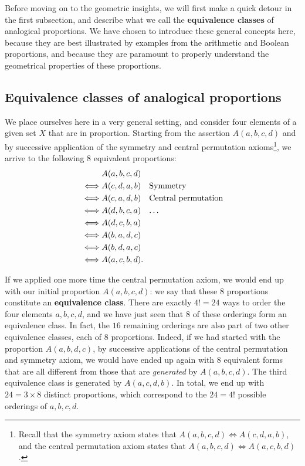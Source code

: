 Before moving on to the geometric insights, we will first make a quick
detour in the first subsection, and describe what we call the
\textbf{equivalence classes} of analogical proportions. We have chosen to
introduce these general concepts here, because they are best illustrated by
examples from the arithmetic and Boolean proportions, and because they are
paramount to properly understand the geometrical properties of these
proportions.

\subsection{Equivalence classes of analogical proportions}

We place ourselves here in a very general setting, and consider four elements of
a given set $X$ that are in proportion.  Starting from the assertion $A(a, b,
c, d)$ and by successive application of the symmetry and central permutation
axioms\footnote{Recall that the symmetry axiom states that $A(a, b, c, d)
\iff A(c, d, a, b)$, and the central permutation axiom states that $A(a, b,
c, d) \iff A(a, c, b, d)$.}, we arrive to the following $8$ equivalent
proportions:
\begin{align*}
       &A(a, b, c, d)\\
  \iff &A(c, d, a, b) \text{~~ Symmetry}\\
  \iff &A(c, a, d, b) \text{~~ Central permutation}\\
  \iff &A(d, b, c, a) \text{~~ \dots}\\
  \iff &A(d, c, b, a)\\
  \iff &A(b, a, d, c)\\
  \iff &A(b, d, a, c)\\
  \iff &A(a, c, b, d).
\end{align*}

If we applied one more time the central permutation axiom, we would end up with
our initial proportion $A(a,b,c,d)$: we say that these $8$ proportions
constitute an \textbf{equivalence class}. There are exactly $4! = 24$ ways to
order the four elements $a, b, c, d$, and we have just seen that $8$ of these
orderings form an equivalence class. In fact, the $16$ remaining orderings are
also part of two other equivalence classes, each of $8$ proportions. Indeed, if we had
started with the proportion $A(a,b,d,c)$, by successive applications of the
central permutation and symmetry axiom, we would have ended up again with $8$
equivalent forms that are all different from those that are \textit{generated}
by $A(a, b, c, d)$. The third equivalence class is generated by $A(a, c, d, b)$.
In total, we end up with $24 = 3 \times 8$ distinct proportions, which
correspond to the $24 = 4!$ possible orderings of $a, b, c, d$.

